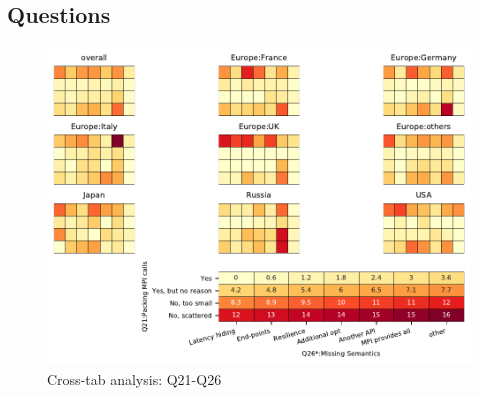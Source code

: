 
\subsection{Questions}


\begin{figure}
\begin{center}
\includegraphics[width=12cm]{../pdfs/Q21-Q26.pdf}
\caption{Cross-tab analysis: Q21-Q26}
\label{fig:Q21-Q26}
\end{center}
\end{figure}

